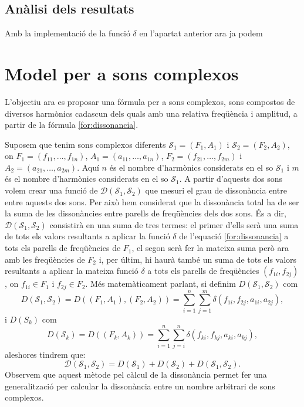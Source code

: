 \documentclass{article}
\theoremstyle{math}
\newcommand{\0}{\ensuremath{\vb{0}}}
\begin{document}
\subsection{Anàlisi dels resultats}
Amb la implementació de la funció $\delta$ en l'apartat anterior ara ja podem 
\section{Model per a sons complexos}
L'objectiu ara es proposar una fórmula per a sons complexos, sons compostos de diversos harmònics cadascun dels quals amb una relativa freqüència i amplitud, a partir de la fórmula \eqref{for:dissonancia}.\par 
Suposem que tenim sons complexos diferents $\mathcal{S}_1=(F_1, A_1)$ i $\mathcal{S}_2=(F_2, A_2)$, on $F_1=(f_{11},\ldots, f_{1n})$, $A_1=(a_{11},\ldots, a_{1n})$, $F_2=(f_{21},\ldots, f_{2m})$ i $A_2=(a_{21},\ldots, a_{2m})$. Aquí $n$ és el nombre d'harmònics considerats en el so $\mathcal{S}_1$ i $m$ és el nombre d'harmònics considerats en el so $\mathcal{S}_1$. A partir d'aquests dos sons volem crear una funció de $\mathcal{D}(\mathcal{S}_1, \mathcal{S}_2)$ que mesuri el grau de dissonància entre entre aquests dos sons. Per això hem considerat que la dissonància total ha de ser la suma de les dissonàncies entre parells de freqüències dels dos sons. És a dir, $\mathcal{D}(\mathcal{S}_1, \mathcal{S}_2)$ consistirà en una suma de tres termes: el primer d'ells serà una suma de tots els valors resultants a aplicar la funció $\delta$ de l'equació \eqref{for:dissonancia} a tots els parells de freqüències de $F_1$, el segon serà fer la mateixa suma però ara amb les freqüències de $F_2$ i, per últim, hi haurà també un suma de tots els valors resultants a aplicar la mateixa funció $\delta$ a tots els parells de freqüències $(f_{1i}, f_{2j})$, on $f_{1i}\in F_1$ i $f_{2j}\in F_2$. Més matemàticament parlant, si definim $D(\mathcal{S}_1, \mathcal{S}_2)$ com 
$$D(\mathcal{S}_1, \mathcal{S}_2)=D((F_1, A_1), (F_2, A_2))=\sum_{i=1}^n\sum_{j=1}^m\delta(f_{1i}, f_{2j}, a_{1i}, a_{2j}),$$ i $D(S_k)$ com $$D(\mathcal{S}_k)=D((F_k, A_k))=\sum_{i=1}^n\sum_{j=i}^n\delta(f_{ki}, f_{kj}, a_{ki}, a_{kj}),$$ aleshores tindrem que:
\begin{equation}
    \mathcal{D}(\mathcal{S}_1, \mathcal{S}_2)=D(\mathcal{S}_1)+D(\mathcal{S}_2)+D(\mathcal{S}_1, \mathcal{S}_2).
\end{equation}
Observem que aquest mètode pel càlcul de la dissonància permet fer una generalització per calcular la dissonància entre un nombre arbitrari de sons complexos. 
\end{document}
